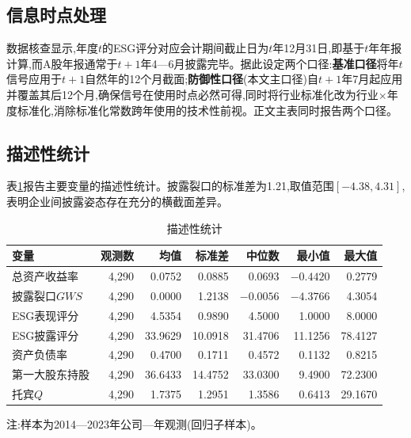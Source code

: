 \documentclass[UTF8, a4paper, fontset=fandol, zihao=-4]{ctexart}
\begin{document}
\subsection{信息时点处理}

数据核查显示,年度$t$的ESG评分对应会计期间截止日为$t$年12月31日,即基于$t$年年报计算,而A股年报通常于$t+1$年4—6月披露完毕。据此设定两个口径:\textbf{基准口径}将年$t$信号应用于$t+1$自然年的12个月截面;\textbf{防御性口径}(本文主口径)自$t+1$年7月起应用并覆盖其后12个月,确保信号在使用时点必然可得,同时将行业标准化改为行业$\times$年度标准化,消除标准化常数跨年使用的技术性前视。正文主表同时报告两个口径。

\subsection{描述性统计}

表\ref{tab:desc}报告主要变量的描述性统计。披露裂口的标准差为1.21,取值范围$[-4.38, 4.31]$,表明企业间披露姿态存在充分的横截面差异。

\begin{table}[H]
\centering
\begin{threeparttable}
\caption{描述性统计}\label{tab:desc}
\begin{tabular}{lrrrrrr}
\toprule
变量 & 观测数 & 均值 & 标准差 & 中位数 & 最小值 & 最大值 \\
\midrule
总资产收益率 & 4{,}290 & 0.0752 & 0.0885 & 0.0693 & $-0.4420$ & 0.2779 \\
披露裂口$GWS$ & 4{,}290 & 0.0000 & 1.2138 & $-0.0056$ & $-4.3766$ & 4.3054 \\
ESG表现评分 & 4{,}290 & 4.5354 & 0.9890 & 4.5000 & 1.0000 & 8.0000 \\
ESG披露评分 & 4{,}290 & 33.9629 & 10.0918 & 31.4706 & 11.1256 & 78.4127 \\
资产负债率 & 4{,}290 & 0.4700 & 0.1711 & 0.4572 & 0.1132 & 0.8215 \\
第一大股东持股 & 4{,}290 & 36.6433 & 14.4752 & 33.0300 & 9.4900 & 72.2300 \\
托宾$Q$ & 4{,}290 & 1.7375 & 1.2951 & 1.3586 & 0.6413 & 29.1670 \\
\bottomrule
\end{tabular}
\begin{tablenotes}
\item 注:样本为2014—2023年公司—年观测(回归子样本)。
\end{tablenotes}
\end{threeparttable}
\end{table}
\end{document}
